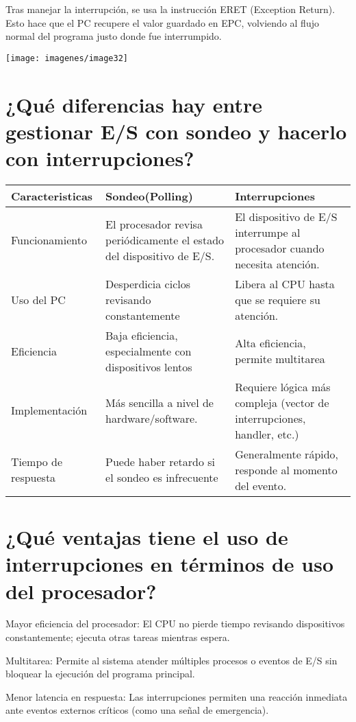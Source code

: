 \documentclass[]{article}
\begin{document}
 Tras manejar la interrupción, se usa la instrucción ERET (Exception Return). Esto hace que el PC recupere el valor guardado en EPC, volviendo al flujo normal del programa justo donde fue interrumpido.
 
 \begin{center}
 	\texttt{[image: imagenes/image32]}
 \end{center}

\section{¿Qué diferencias hay entre gestionar E/S con sondeo y hacerlo con interrupciones?}

\begin{tabular}{|p{3.5cm}|p{3.5cm}|p{3.5cm}|}
	\hline
	Caracteristicas & Sondeo(Polling) & Interrupciones \\
	\hline
	Funcionamiento & El procesador revisa periódicamente el estado del dispositivo de E/S. & El dispositivo de E/S interrumpe al procesador cuando necesita atención. \\
	\hline
	Uso del PC & Desperdicia ciclos revisando constantemente & Libera al CPU hasta que se requiere su atención. \\
	\hline
	Eficiencia &  Baja eficiencia, especialmente con dispositivos lentos &  Alta eficiencia, permite multitarea \\
	\hline
	Implementación & Más sencilla a nivel de hardware/software. &  Requiere lógica más compleja (vector de interrupciones, handler, etc.) \\
	\hline
	Tiempo de respuesta & Puede haber retardo si el sondeo es infrecuente & Generalmente rápido, responde al momento del evento. \\
	\hline
\end{tabular}

\section{¿Qué ventajas tiene el uso de interrupciones en términos de uso del procesador?}

 Mayor eficiencia del procesador:
El CPU no pierde tiempo revisando dispositivos constantemente; ejecuta otras tareas mientras espera.

 Multitarea:
Permite al sistema atender múltiples procesos o eventos de E/S sin bloquear la ejecución del programa principal.

 Menor latencia en respuesta:
Las interrupciones permiten una reacción inmediata ante eventos externos críticos (como una señal de emergencia).
\end{document}
